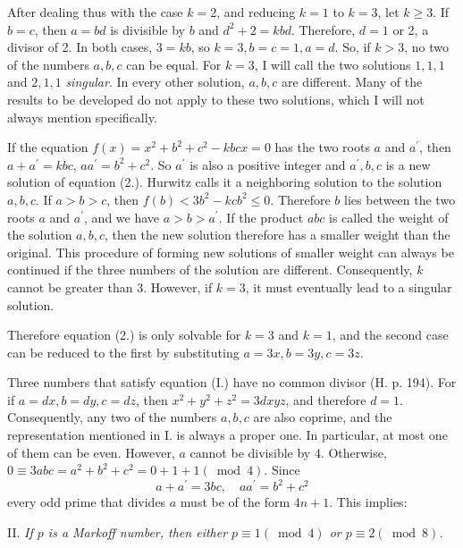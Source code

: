 \documentclass[12pt]{article}
\begin{document}
After dealing thus with the case $k=2$, and reducing $k=1$ to $k=3$, let $k \geq 3$. If $b=c$, then $a=b d$ is divisible by $b$ and $d^{2}+2=k b d$. Therefore, $d=1$ or 2, a divisor of 2. In both cases, $3=k b$, so $k=3, b=c=1, a=d$. So, if $k>3$, no two of the numbers $a, b, c$ can be equal. For $k=3$, I will call the two solutions $1,1,1$ and $2,1,1$ \textit{singular}. In every other solution, $a, b, c$ are different. Many of the results to be developed do not apply to these two solutions, which I will not always mention specifically.

If the equation $f(x)=x^{2}+b^{2}+c^{2}-k b c x=0$ has the two roots $a$ and $a^{\prime}$, then $a+a^{\prime}=k b c$, $a a^{\prime}=b^{2}+c^{2}$. So $a^{\prime}$ is also a positive integer and $a^{\prime}, b, c$ is a new solution of equation (2.). Hurwitz calls it a neighboring solution to the solution $a, b, c$. If $a>b>c$, then $f(b)<3 b^{2}-k c b^{2} \leq 0$. Therefore $b$ lies between the two roots $a$ and $a^{\prime}$, and we have $a>b>a^{\prime}$. If the product $a b c$ is called the weight of the solution $a, b, c$, then the new solution therefore has a smaller weight than the original. This procedure of forming new solutions of smaller weight can always be continued if the three numbers of the solution are different. Consequently, $k$ cannot be greater than 3. However, if $k=3$, it must eventually lead to a singular solution.

Therefore equation (2.) is only solvable for $k=3$ and $k=1$, and the second case can be reduced to the first by substituting $a=3 x, b=3 y, c=3 z$.

Three numbers that satisfy equation (I.) have no common divisor (H. p. 194). For if $a=d x, b=d y, c=d z$, then $x^{2}+y^{2}+z^{2}=3 d x y z$, and therefore $d=1$. Consequently, any two of the numbers $a, b, c$ are also coprime, and the representation mentioned in I. is always a proper one. In particular, at most one of them can be even. However, $a$ cannot be divisible by 4. Otherwise, $0 \equiv 3 a b c=a^{2}+b^{2}+c^{2}=0+1+1(\bmod 4)$. Since
\begin{equation*}
a+a^{\prime}=3 b c, \quad a a^{\prime}=b^{2}+c^{2} \tag{3.}
\end{equation*}
every odd prime that divides $a$ must be of the form $4n+1$. This implies:

\bigskip

II. \textit{If $p$ is a Markoff number, then either $p \equiv 1(\bmod 4)$ or $p \equiv 2(\bmod 8)$.}

\bigskip
\end{document}
